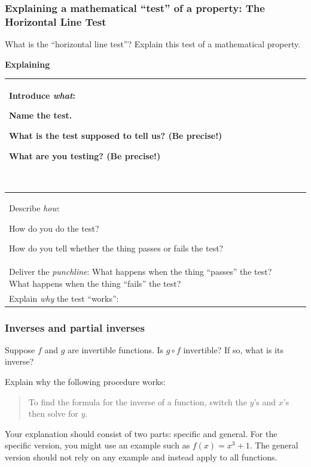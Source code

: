 \documentclass[11pt]{article}
\newcommand{\handout}{\subsubsection}
\theoremstyle{definition}
\begin{document}
\newpage 
\handout{Explaining a mathematical ``test'' of a property: The Horizontal Line Test}

What is the ``horizontal line test''? Explain this test of a mathematical property.  

\begin{center}
{\bf Explaining  \underline{\hspace*{2in}}}
\end{center}
\begin{tabular}{|L{2.2in}|L{3.7in}|}
\hline 
Introduce {\it what}:	
	\begin{itemize*}
	\item Name the test.
	\item What is the test supposed to tell us? (Be precise!) 
	\item What are you testing? (Be precise!) 
	\end{itemize*} \vspace*{-12pt}$\;$
	& 

	\\ \hline 
Describe {\it how}:
	\begin{itemize*}
	\item How do you do the test?
	\item How do you tell whether the thing passes or fails the test?
	\end{itemize*}
	& 

	\\ \hline 
Deliver the {\it punchline}: What happens when the thing ``passes'' the test? What happens when the thing ``fails'' the test?
	& 

	 \\ \hline 
Explain {\it why} the test ``works'': 
	& \vspace*{2in}
	\\ \hline 
\end{tabular}

\newpage
\handout{Inverses and partial inverses}
Suppose $f$ and $g$ are invertible functions. Is $g\circ f$ invertible? If so, what is its inverse?


\vfill
Explain why the following procedure works:

\begin{quote}
To find the formula for the inverse of a function, switch the $y$'s and $x$'s then solve for $y$.
\end{quote}

Your explanation should consist of two parts: specific and general. For the specific version, you might use an example such as $f(x)=x^3+1$. The general version should not rely on any example and instead apply to all functions.
\end{document}
